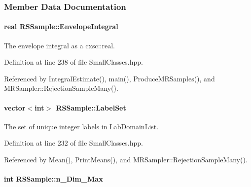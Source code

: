 \subsubsection{\-Member \-Data \-Documentation}
\hypertarget{classRSSample_aa3f52ce941256fc7d6cf71347fdfa67c}{
\paragraph[{\-Envelope\-Integral}]{\setlength{\rightskip}{0pt plus 5cm}real {\bf \-R\-S\-Sample\-::\-Envelope\-Integral}}}\label{classRSSample_aa3f52ce941256fc7d6cf71347fdfa67c}


\-The envelope integral as a cxsc\-::real. 



\-Definition at line 238 of file \-Small\-Classes.\-hpp.



\-Referenced by \-Integral\-Estimate(), main(), \-Produce\-M\-R\-Samples(), and \-M\-R\-Sampler\-::\-Rejection\-Sample\-Many().

\hypertarget{classRSSample_a1a4bb7b0764f4d82e6db5eb24ce86d34}{
\paragraph[{\-Label\-Set}]{\setlength{\rightskip}{0pt plus 5cm}vector$<$int$>$ {\bf \-R\-S\-Sample\-::\-Label\-Set}}}\label{classRSSample_a1a4bb7b0764f4d82e6db5eb24ce86d34}


\-The set of unique integer labels in \-Lab\-Domain\-List. 



\-Definition at line 232 of file \-Small\-Classes.\-hpp.



\-Referenced by \-Mean(), \-Print\-Means(), and \-M\-R\-Sampler\-::\-Rejection\-Sample\-Many().

\hypertarget{classRSSample_a7aff363040b93e76f56f58db43b68894}{
\paragraph[{n\-\_\-\-Dim\-\_\-\-Max}]{\setlength{\rightskip}{0pt plus 5cm}int {\bf \-R\-S\-Sample\-::n\-\_\-\-Dim\-\_\-\-Max}}}\label{classRSSample_a7aff363040b93e76f56f58db43b68894}


